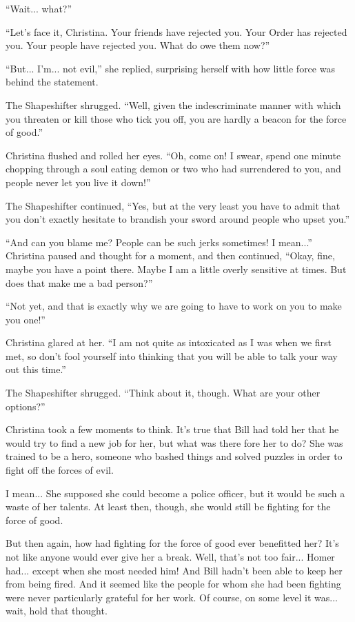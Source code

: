 \documentclass[showtrims,b6paper,draft,10pt]{memoir}
\begin{document}
``Wait... what?''

``Let's face it, Christina.  Your friends have rejected you.  Your Order has rejected you.  Your people have rejected you.  What do owe them now?''

``But... I'm... not evil,'' she replied, surprising herself with how little force was behind the statement.

The Shapeshifter shrugged.  ``Well, given the indescriminate manner with which you threaten or kill those who tick you off, you are hardly a beacon for the force of good.''

Christina flushed and rolled her eyes.  ``Oh, come on!  I swear, spend one minute chopping through a soul eating demon or two who had surrendered to you, and people  never let you live it down!''

The Shapeshifter continued,  ``Yes, but at the very least you have to admit that you don't exactly hesitate to brandish your sword around people who upset you.''

``And can you blame me?  People can be such jerks sometimes!  I mean...''  Christina paused and thought for a moment, and then continued,  ``Okay, fine, maybe you have a point there.  Maybe I am a little overly sensitive at times.  But does that make me a bad person?''

``Not yet, and that is exactly why we are going to have to work on you to make you one!''

Christina glared at her.  ``I am not quite as intoxicated as I was when we first met, so don't fool yourself into thinking that you will be able to talk your way out this time.''

The Shapeshifter shrugged.  ``Think about it, though.  What are your other options?''

Christina took a few moments to think.  It's true that Bill had told her that he would try to find a new job for her, but what was there fore her to do?  She was trained to be a hero, someone who bashed things and solved puzzles in order to fight off the forces of evil.

I mean... She supposed she could become a police officer, but it would be such a waste of her talents.  At least then, though, she would still be fighting for the force of good.

But then again, how had fighting for the force of good ever benefitted her?  It's not like anyone would ever give her a break.  Well, that's not too fair... Homer had... except when she most needed him!  And Bill hadn't been able to keep her from being fired.  And it seemed like the people for whom she had been fighting were never particularly grateful for her work.  Of course, on some level it was...  wait, hold that thought.
\end{document}
